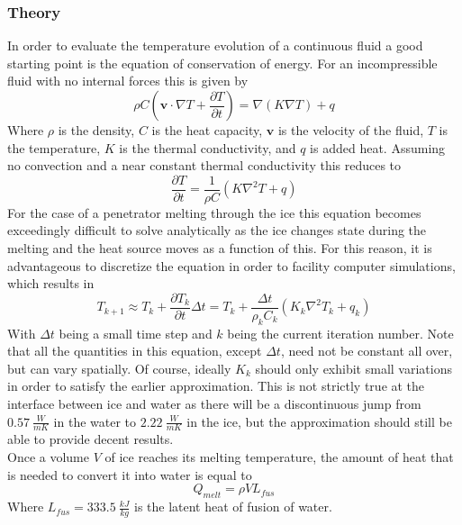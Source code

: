 \subsubsection{Theory}
In order to evaluate the temperature evolution of a continuous fluid a good starting point is the equation of conservation of energy. For an incompressible fluid with no internal forces this is given by
\begin{equation}
\rho C \left( \mathbf{v} \cdot \nabla T + \frac{\partial T}{\partial t} \right) = \nabla (K \nabla T) + q 
\end{equation} 
Where $\rho$ is the density, $C$ is the heat capacity, $\mathbf{v}$ is the velocity of the fluid, $T$ is the temperature, $K$ is the thermal conductivity, and $q$ is added heat\cite{article:barr2014a}. Assuming no convection and a near constant thermal conductivity this reduces to
\begin{equation}
\label{eq:thermal1}
\frac{\partial T}{\partial t} = \frac{1}{\rho C}\left( K \nabla^2 T + q \right)
\end{equation}
For the case of a penetrator melting through the ice this equation becomes exceedingly difficult to solve analytically as the ice changes state during the melting and the heat source moves as a function of this. For this reason, it is advantageous to discretize the equation in order to facility computer simulations, which results in\\
\begin{equation} \label{eq:thermal2}
T_{k+1} \approx T_{k} + \frac{\partial T_{k}}{\partial t}\Delta t = T_{k} + \frac{\Delta t}{\rho_k C_k}\left( K_k \nabla^2 T_{k} + q_{k} \right)
\end{equation}
With $\Delta t$ being a small time step and $k$ being the current iteration number. Note that all the quantities in this equation, except $\Delta t$, need not be constant all over, but can vary spatially. Of course, ideally $K_k$ should only exhibit small variations in order to satisfy the earlier approximation. This is not strictly true at the interface between ice and water as there will be a discontinuous jump from $\SI{0.57}{\frac{W}{m K}}$ in the water to $\SI{2.22}{\frac{W}{m K}}$\cite{website:engineeringToolbox} in the ice, but the approximation should still be able to provide decent results.\\

\noindent
Once a volume $V$ of ice reaches its melting temperature, the amount of heat that is needed to convert it into water is equal to
\begin{equation}
Q_{melt} = \rho V L_{fus}
\end{equation}
Where $L_{fus} = \SI{333.5}{\frac{kJ}{kg}}$ is the latent heat of fusion of water\cite{article:biele2011a}.


